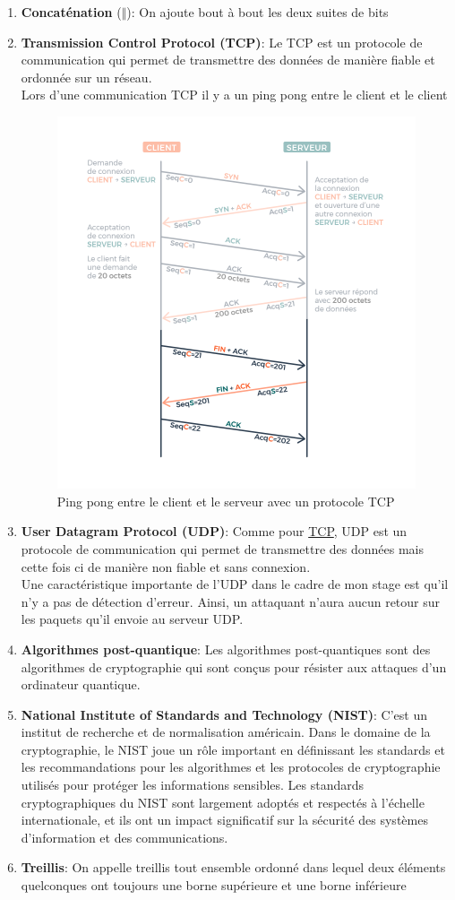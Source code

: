 \documentclass[a4paper, 12pt]{article}
\begin{document}
\begin{enumerate}
	\item \textbf{Concaténation} ($\Vert$)\label{concat}: On ajoute bout à bout les deux suites de bits
	\item \textbf{Transmission Control Protocol (TCP)}\label{TCP}: Le TCP est un protocole de communication qui permet de transmettre des données de manière fiable et ordonnée sur un réseau. \\
Lors d'une communication TCP il y a un ping pong entre le client et le client
	\begin{figure}[h]
		\centering
		\includegraphics[width=.7\textwidth]{img/TCP.png}
		\caption{Ping pong entre le client et le serveur avec un protocole TCP}
		\label{pingpongtcp}
	\end{figure}
\item \textbf{User Datagram Protocol (UDP)}\label{UDP}: Comme pour \hyperref[TCP]{TCP}, UDP est un protocole de communication qui permet de transmettre des données mais cette fois ci de manière non fiable et sans connexion. \\
Une caractéristique importante de l'UDP dans le cadre de mon stage est qu'il n'y a pas de détection d'erreur. Ainsi, un attaquant n'aura aucun retour sur les paquets qu'il envoie au serveur UDP.
\item \textbf{Algorithmes post-quantique}\label{postquant}: Les algorithmes post-quantiques sont des algorithmes de cryptographie qui sont conçus pour résister aux attaques d'un ordinateur quantique. 
\item \textbf{National Institute of Standards and Technology (NIST)}\label{NIST}: C'est un institut de recherche et de normalisation américain. Dans le domaine de la cryptographie, le NIST joue un rôle important en définissant les standards et les recommandations pour les algorithmes et les protocoles de cryptographie utilisés pour protéger les informations sensibles. Les standards cryptographiques du NIST sont largement adoptés et respectés à l'échelle internationale, et ils ont un impact significatif sur la sécurité des systèmes d'information et des communications.
\item \textbf{Treillis}\label{treillis}: On appelle treillis tout ensemble ordonné dans lequel deux éléments quelconques ont toujours une borne supérieure et une borne inférieure
\end{enumerate}
\newpage
\end{document}
